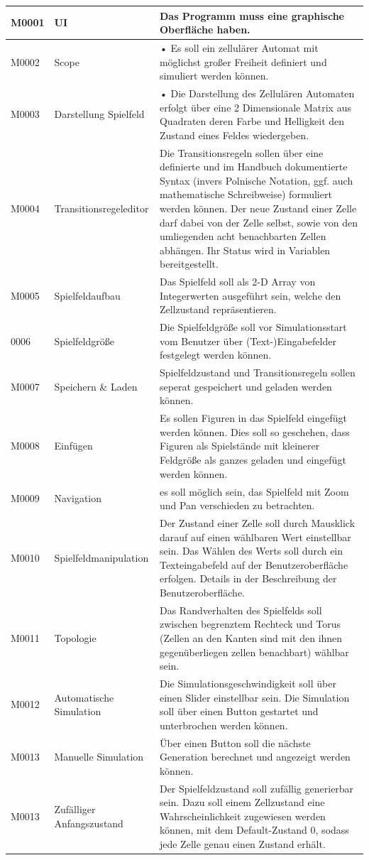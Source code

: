 \documentclass[11pt,a4paper]{article}
\begin{document}
\begin{longtable}[m]{|m{2.2cm}|m{4cm}|m{8cm}|}
\hline
M0001     & UI & Das Programm muss eine graphische Oberfläche haben.  \\
\hline
M0002 & Scope & •	Es soll ein zellulärer Automat mit möglichst großer Freiheit definiert und simuliert werden können.  \\
\hline
M0003 & Darstellung Spielfeld & •	Die Darstellung des Zellulären Automaten erfolgt über eine 2 Dimensionale Matrix aus Quadraten deren Farbe und Helligkeit den Zustand eines Feldes wiedergeben. \\
\hline
M0004 & Transitionsregeleditor & Die Transitionsregeln sollen über eine definierte und im Handbuch dokumentierte Syntax (invers Polnische Notation, ggf. auch mathematische Schreibweise) formuliert werden können. Der neue Zustand einer Zelle darf dabei von der Zelle selbst, sowie von den umliegenden acht benachbarten Zellen abhängen. Ihr Status wird in Variablen bereitgestellt.\\
\hline
M0005 & Spielfeldaufbau & Das Spielfeld soll als 2-D Array von Integerwerten ausgeführt sein, welche den Zellzustand repräsentieren.\\
\hline
0006 & Spielfeldgröße & Die Spielfeldgröße soll vor Simulationsstart vom Benutzer über (Text-)Eingabefelder festgelegt werden können.\\
\hline
M0007 & Speichern \& Laden & Spielfeldzustand und Transitionsregeln sollen seperat gespeichert und geladen werden können.  \\
\hline
M0008 & Einfügen & Es sollen Figuren in das Spielfeld eingefügt werden können. Dies soll so geschehen, dass Figuren als Spielstände mit kleinerer Feldgröße als ganzes geladen und eingefügt werden können. \\
\hline
M0009 & Navigation & es soll möglich sein, das Spielfeld mit Zoom und Pan verschieden zu betrachten. \\
\hline
M0010 & Spielfeldmanipulation & Der Zustand einer Zelle soll durch Mausklick darauf auf einen wählbaren Wert einstellbar sein. Das Wählen des Werts soll durch ein Texteingabefeld auf der Benutzeroberfläche erfolgen. Details in der Beschreibung der Benutzeroberfläche.\\
\hline
M0011 & Topologie & Das Randverhalten des Spielfelds soll zwischen begrenztem Rechteck und Torus (Zellen an den Kanten sind mit den ihnen gegenüberliegen zellen benachbart) wählbar sein.\\
\hline
M0012 & Automatische Simulation & Die Simulationsgeschwindigkeit soll über einen Slider einstellbar sein. Die Simulation soll über einen Button gestartet und unterbrochen werden können.\\
\hline
M0013 & Manuelle Simulation & Über einen Button soll die nächste Generation berechnet und angezeigt werden können. \\
\hline
M0013 & Zufälliger Anfangszustand & Der Spielfeldzustand soll zufällig generierbar sein. Dazu soll einem Zellzustand eine Wahrscheinlichkeit zugewiesen werden können, mit dem Default-Zustand 0, sodass jede Zelle genau einen Zustand erhält.\\


\end{longtable}
\end{document}
